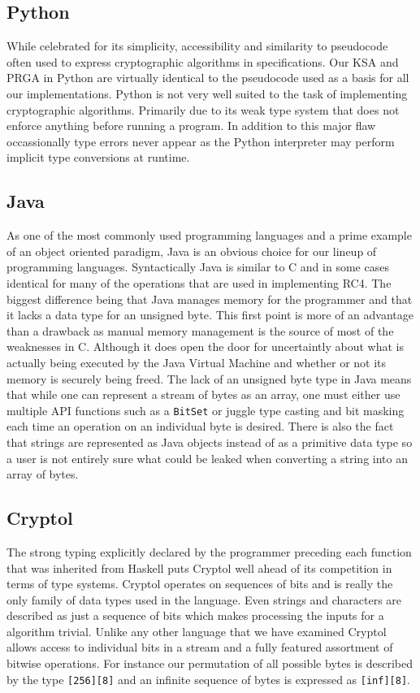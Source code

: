 \subsection{Python}
While celebrated for its simplicity, accessibility and similarity to pseudocode often used to express cryptographic algorithms in specifications. Our KSA and PRGA 
in Python are virtually identical to the pseudocode used as a basis for all our implementations. Python is not very well suited to the task of implementing 
cryptographic algorithms. Primarily due to its weak type system that does not enforce anything before running a program. In addition to this major flaw occassionally type 
errors never appear as the Python interpreter may perform implicit type conversions at runtime.

\subsection{Java}
As one of the most commonly used programming languages and a prime example of an object oriented paradigm, Java is an obvious choice for our lineup of programming languages.
Syntactically Java is similar to C and in some cases identical for many of the operations that are used in implementing RC4. The biggest difference being that Java manages 
memory for the programmer and that it lacks a data type for an unsigned byte. This first point is more of an advantage than a drawback as manual memory management is the 
source of most of the weaknesses in C. Although it does open the door for uncertaintly about what is actually being executed by the Java Virtual Machine and whether or not 
its memory is securely being freed. The lack of an unsigned byte type in Java means that while one can represent a stream of bytes as an array, one must either use multiple 
API functions such as a \texttt{BitSet} or juggle type casting and bit masking each time an operation on an individual byte is desired. There is also the fact that 
strings are represented as Java objects instead of as a primitive data type so a user is not entirely sure what could be leaked when converting a string into an array of 
bytes.

\subsection{Cryptol}
The strong typing explicitly declared by the programmer preceding each function that was inherited from Haskell puts Cryptol well ahead of its competition in terms of 
type systems. Cryptol operates on sequences of bits and is really the only family of data types used in the language. Even strings and characters are described as just a 
sequence of bits which makes processing the inputs for a algorithm trivial. Unlike any other language that we have examined Cryptol allows access to individual bits in a 
stream and a fully featured assortment of bitwise operations. For instance our permutation of all possible bytes is described by the type \texttt{[256][8]} and an 
infinite sequence of bytes is expressed as \texttt{[inf][8]}. 

